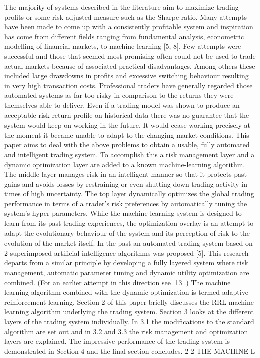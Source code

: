 \documentclass{pracamgr_wne}\usepackage[]{graphicx}\usepackage[]{color}
\begin{document}
 The majority of systems described
in the literature aim to maximize trading profits or some risk-adjusted measure such as the
Sharpe ratio.
Many attempts have been made to come up with a consistently profitable system and
inspiration has come from different fields ranging from fundamental analysis, econometric
modelling of financial markets, to machine-learning [5, 8]. Few attempts were successful
and those that seemed most promising often could not be used to trade actual markets
because of associated practical disadvantages. Among others these included large drawdowns
in profits and excessive switching behaviour resulting in very high transaction costs.
Professional traders have generally regarded those automated systems as far too risky in
comparison to the returns they were themselves able to deliver. Even if a trading model
was shown to produce an acceptable risk-return profile on historical data there was no
guarantee that the system would keep on working in the future. It would cease working
precisely at the moment it became unable to adapt to the changing market conditions.
This paper aims to deal with the above problems to obtain a usable, fully automated
and intelligent trading system. To accomplish this a risk management layer and a dynamic
optimization layer are added to a known machine-learning algorithm. The middle layer
manages risk in an intelligent manner so that it protects past gains and avoids losses by restraining
or even shutting down trading activity in times of high uncertainty. The top layer
dynamically optimizes the global trading performance in terms of a trader’s risk preferences
by automatically tuning the system’s hyper-parameters. While the machine-learning
system is designed to learn from its past trading experiences, the optimization overlay is
an attempt to adapt the evolutionary behaviour of the system and its perception of risk
to the evolution of the market itself. In the past an automated trading system based on 2
superimposed artificial intelligence algorithms was proposed [5]. This research departs from
a similar principle by developing a fully layered system where risk management, automatic
parameter tuning and dynamic utility optimization are combined. (For an earlier attempt
in this direction see [13].) The machine learning algorithm combined with the dynamic
optimization is termed adaptive reinforcement learning.
Section 2 of this paper briefly discusses the RRL machine-learning algorithm underlying
the trading system. Section 3 looks at the different layers of the trading system individually.
In 3.1 the modifications to the standard algorithm are set out and in 3.2 and 3.3 the risk
management and optimization layers are explained. The impressive performance of the
trading system is demonstrated in Section 4 and the final section concludes.
2
2 THE MACHINE-L
\end{document}
